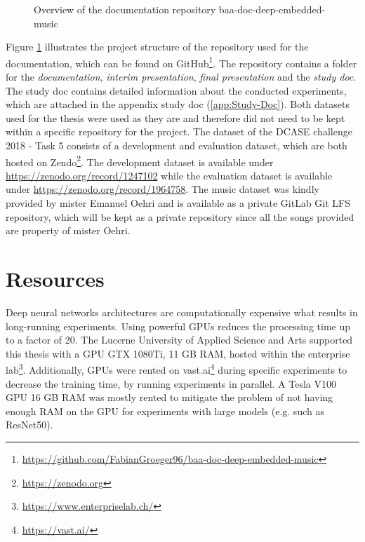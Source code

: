 \begin{figure}[ht]
\caption{Overview of the documentation repository \flqq baa-doc-deep-embedded-music\frqq}
\label{fig:Project-Overview-Documentation}
\end{figure}
\noindent
Figure \ref{fig:Project-Overview-Documentation} illustrates the project structure of the repository used for the documentation, which can be found on GitHub\footnote{\url{https://github.com/FabianGroeger96/baa-doc-deep-embedded-music}}. The repository contains a folder for the \textit{documentation}, \textit{interim presentation}, \textit{final presentation} and the \textit{study doc}. The study doc contains detailed information about the conducted experiments, which are attached in the appendix study doc (\ref{app:Study-Doc}).
\newline
\newline
Both datasets used for the thesis were used as they are and therefore did not need to be kept within a specific repository for the project. The dataset of the DCASE challenge 2018 - Task 5 consists of a development and evaluation dataset, which are both hosted on Zendo\footnote{\url{https://zenodo.org}}. The development dataset is available under \url{https://zenodo.org/record/1247102} while the evaluation dataset is available under \url{https://zenodo.org/record/1964758}. 
\newline
\newline
The music dataset was kindly provided by mister Emanuel Oehri and is available as a private GitLab Git LFS repository, which will be kept as a private repository since all the songs provided are property of mister Oehri.

\section{Resources}
\label{sec:Resources}
Deep neural networks architectures are computationally expensive what results in long-running experiments. Using powerful \glspl{GPU} reduces the processing time up to a factor of 20. The Lucerne University of Applied Science and Arts supported this thesis with a GPU GTX 1080Ti, 11 GB RAM, hosted within the enterprise lab\footnote{\url{https://www.enterpriselab.ch/}}. 
\newline
\newline
Additionally, \glspl{GPU} were rented on vast.ai\footnote{\url{https://vast.ai/}} during specific experiments to decrease the training time, by running experiments in parallel. A Tesla V100 \gls{GPU} 16 GB RAM was mostly rented to mitigate the problem of not having enough RAM on the GPU for experiments with large models (e.g. such as ResNet50).

